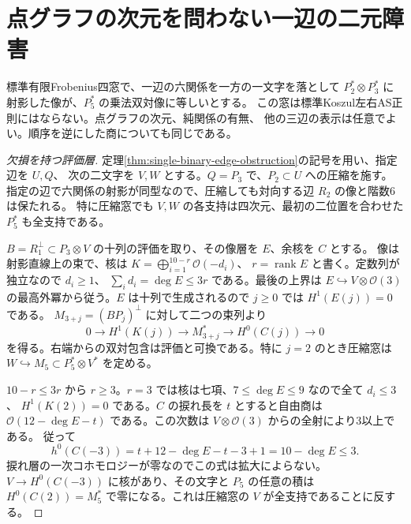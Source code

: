 \section{点グラフの次元を問わない一辺の二元障害}
\label{sec:binary-edge-basepoints}
\begin{theorem}\label{thm:binary-edge-basepoints}
標準有限Frobenius四窓で、一辺の六関係を一方の一文字を落として
$P_2^*\otimes P_3^*$ に射影した像が、$P_5^*$ の乗法双対像に等しいとする。
この窓は標準Koszul左右AS正則にはならない。点グラフの次元、純関係の有無、
他の三辺の表示は任意でよい。順序を逆にした商についても同じである。
\end{theorem}
\begin{proof}[欠損を持つ評価層]
定理\ref{thm:single-binary-edge-obstruction}の記号を用い、指定辺を $U,Q$、
次の二文字を $V,W$ とする。$Q=P_3$ で、$P_2\subset U$ への圧縮を施す。
指定の辺で六関係の射影が同型なので、圧縮しても対向する辺 $R_2$ の像と階数6は保たれる。
特に圧縮窓でも $V,W$ の各支持は四次元、最初の二位置を合わせた $P_5^*$ も全支持である。

$B=R_1^\perp\subset P_3\otimes V$ の十列の評価を取り、その像層を $E$、余核を $C$ とする。
像は射影直線上の束で、核は $K=\bigoplus_{i=1}^{10-r}\mathcal O(-d_i)$、
$r=\operatorname{rank}E$ と書く。定数列が独立なので $d_i\ge1$、
$\sum_i d_i=\deg E\le3r$ である。最後の上界は $E\hookrightarrow V\otimes\mathcal O(3)$
の最高外冪から従う。$E$ は十列で生成されるので $j\ge0$ では $H^1(E(j))=0$ である。
$M_{3+j}=(BP_j)^\perp$ に対して二つの束列より
\[
 0\longrightarrow H^1(K(j))\longrightarrow M_{3+j}^*
       \longrightarrow H^0(C(j))\longrightarrow0
\]
を得る。右端からの双対包含は評価と可換である。特に $j=2$ のとき圧縮窓は
$W\hookrightarrow M_5\subset P_5^*\otimes V^*$ を定める。

$10-r\le 3r$ から $r\ge3$。$r=3$ では核は七項、$7\le\deg E\le9$ なので全て $d_i\le3$、
$H^1(K(2))=0$ である。$C$ の捩れ長を $t$ とすると自由商は
$\mathcal O(12-\deg E-t)$ である。この次数は $V\otimes\mathcal O(3)$ からの全射により3以上である。
従って
\[
   h^0(C(-3))=t+12-\deg E-t-3+1=10-\deg E\le3.
\]
捩れ層の一次コホモロジーが零なのでこの式は拡大によらない。
$V\to H^0(C(-3))$ に核があり、その文字と $P_5$ の任意の積は
$H^0(C(2))=M_5^*$ で零になる。これは圧縮窓の $V$ が全支持であることに反する。
\end{proof}
